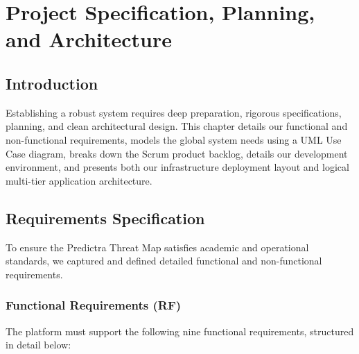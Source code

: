\chapter{Project Specification, Planning, and Architecture}

\section{Introduction}
Establishing a robust system requires deep preparation, rigorous specifications, planning, and clean architectural design. This chapter details our functional and non-functional requirements, models the global system needs using a UML Use Case diagram, breaks down the Scrum product backlog, details our development environment, and presents both our infrastructure deployment layout and logical multi-tier application architecture.

\section{Requirements Specification}
To ensure the Predictra Threat Map satisfies academic and operational standards, we captured and defined detailed functional and non-functional requirements.

\subsection{Functional Requirements (RF)}
The platform must support the following nine functional requirements, structured in detail below:

